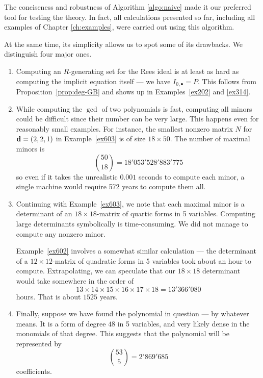 \documentclass[fleqn,reqno]{amsart}
\begin{document}
\begin{paragraf}
\label{par:flaws}
The conciseness and robustness of Algorithm \ref{algo:naive} made it our preferred tool
for testing the theory.
In fact, all calculations presented so far,
including all examples of Chapter \ref{ch:examples},
were carried out using this algorithm.

At the same time, its simplicity allows us to spot some of its drawbacks.
We distinguish four major ones.
\begin{enumerate}
\item
\label{itm:flaws:GB}
Computing an $R$-generating set for the Rees ideal is at least as hard as
computing the implicit equation itself --- we have $I_{0,\bullet}=P$.
This follows from Proposition~\ref{prop:deg-GB} and
shows up in Examples~\ref{ex202} and \ref{ex314}.

\item
\label{itm:flaws:many-minors}
While computing the $\gcd$ of two polynomials is fast,
computing all minors could be difficult since their number can be very large.
This happens even for reasonably small examples.
For instance, the smallest nonzero matrix $N$ for $\mathbf d=(2,2,1)$ in Example~\ref{ex603}
is of size $18\times50$.
The number of maximal minors is
\[
	\binom{50}{18}=18'053'528'883'775
\]
so even if it takes the unrealistic $0.001$ seconds to compute each minor,
a single machine would require 572 years to compute them all.

\item
\label{itm:flaws:large-det}
Continuing with Example~\ref{ex603},
we note that each maximal minor is a determinant of an $18\times18$-matrix
of quartic forms in 5 variables.
Computing large determinants symbolically is time-consuming.
We did not manage to compute any nonzero minor.

Example~\ref{ex602} involves a somewhat similar calculation ---
the determinant of a $12\times12$-matrix of quadratic forms in 5 variables
took about an hour to compute.
Extrapolating, we can speculate that our $18\times18$ determinant would take somewhere
in the order of
\[
	13\times14\times15\times16\times17\times18=13'366'080
\]
hours.
That is about $1525$ years.

\item
\label{itm:flaws:large-poly}
Finally, suppose we have found the polynomial in question --- by whatever means.
It is a form of degree $48$ in 5 variables, and very likely dense in the monomials of that degree.
This suggests that the polynomial will be represented by
\[
	\binom{53}{5}=2'869'685
\]
coefficients.
\end{enumerate}
\end{paragraf}
\end{document}
